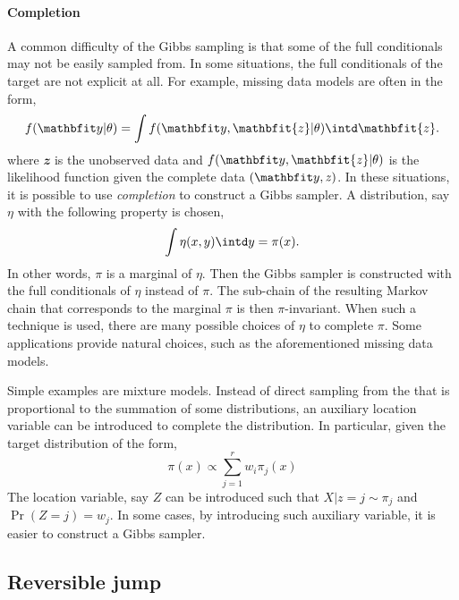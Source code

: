 

\paragraph{Completion}

A common difficulty of the Gibbs sampling is that some of the full conditionals may not be easily sampled from. In some situations, the full conditionals of the target are not explicit at all. For example, missing data models are often in the form,
\begin{equation*}
  f(\data|\theta) = \int f(\data, \mathbfit{z}|\theta)\intd \mathbfit{z}.
\end{equation*}
where $\mathbfit{z}$ is the unobserved data and $f(\data,\mathbfit{z}|\theta)$ is the likelihood function given the complete data $(\data,\mathit{z})$. In these situations, it is possible to use \emph{completion} to construct a Gibbs sampler. A distribution, say $\eta$ with the following property is chosen,
\begin{equation}
  \int\eta(x,y)\intd y = \pi(x).
\end{equation}
In other words, $\pi$ is a marginal of $\eta$. Then the Gibbs sampler is constructed with the full conditionals of $\eta$ instead of $\pi$. The sub-chain of the resulting Markov chain that corresponds to the marginal $\pi$ is then $\pi$-invariant. When such a technique is used, there are many possible choices of $\eta$ to complete $\pi$. Some applications provide natural choices, such as the aforementioned missing data models.
\begin{draftpar}
Simple examples are mixture models. Instead of direct sampling from the  that is proportional to the summation of some distributions, an auxiliary location variable can be introduced to complete the distribution. In particular, given the target distribution of the form,
\begin{equation*}
  \pi(x) \propto \sum_{j=1}^r w_i\pi_j(x)
\end{equation*}
The location variable, say $Z$ can be introduced such that $X|z=j\sim \pi_j$ and $\Pr(Z=j) = w_j$. In some cases, by introducing such  auxiliary variable, it is easier to construct a Gibbs sampler.
\end{draftpar}

\subsection{Reversible jump \protect\mcmc}
\label{sub:Reversible jump mcmc}

